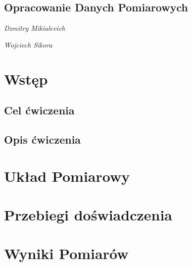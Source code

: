 \documentclass[18pt, twoside]{article}
\begin{document}
\begin{figure}[tp!]
\end{figure}

\begin{center}
    \section*{Opracowanie Danych Pomiarowych}
    \emph{Dzmitry Mikialevich}
\end{center}
\begin{center}
    \emph{Wojciech Sikora}
\end{center}
\tableofcontents
\newpage

\section{Wstęp}
\subsection{Cel ćwiczenia}
\subsection{Opis ćwiczenia}
\section{Układ Pomiarowy}
\section{Przebiegi doświadczenia}
\section{Wyniki Pomiarów}
\end{document}
